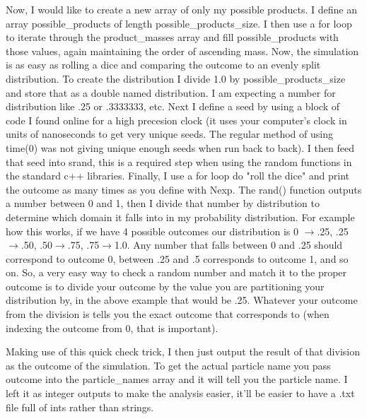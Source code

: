 \documentclass[11pt]{article}
\begin{document}
Now, I would like to create a new array of only my possible products. I define an array possible\_products of length possible\_products\_size. I then use a for loop to iterate through the product\_masses array and fill possible\_products with those values, again maintaining the order of ascending mass. Now, the simulation is as easy as rolling a dice and comparing the outcome to an evenly split distribution. To create the distribution I divide 1.0 by possible\_products\_size and store that as a double named distribution. I am expecting a number for distribution like .25 or .3333333, etc. Next I define a seed by using a block of code I found online for a high precesion clock (it uses your computer's clock in units of nanoseconds to get very unique seeds. The regular method of using time(0) was not giving unique enough seeds when run back to back). I then feed that seed into srand, this is a required step when using the random functions in the standard c++ libraries. Finally, I use a for loop do "roll the dice" and print the outcome as many times as you define with Nexp. The rand() function outputs a number between 0 and 1, then I divide that number by distribution to determine which domain it falls into in my probability distribution. For example how this works, if we have 4 possible outcomes our distribution is 0 $\rightarrow$.25, .25$\rightarrow$.50, .50$\rightarrow$.75, .75$\rightarrow$1.0. Any number that falls between 0 and .25 should correspond to outcome 0, between .25 and .5 corresponds to outcome 1, and so on. So, a very easy way to check a random number and match it to the proper outcome is to divide your outcome by the value you are partitioning your distribution by, in the above example that would be .25. Whatever your outcome from the division is tells you the exact outcome that corresponds to (when indexing the outcome from 0, that is important). 

Making use of this quick check trick, I then just output the result of that division as the outcome of the simulation. To get the actual particle name you pass outcome into the particle\_names array and it will tell you the particle name. I left it as integer outputs to make the analysis easier, it'll be easier to have a .txt file full of ints rather than strings. 
\end{document}
